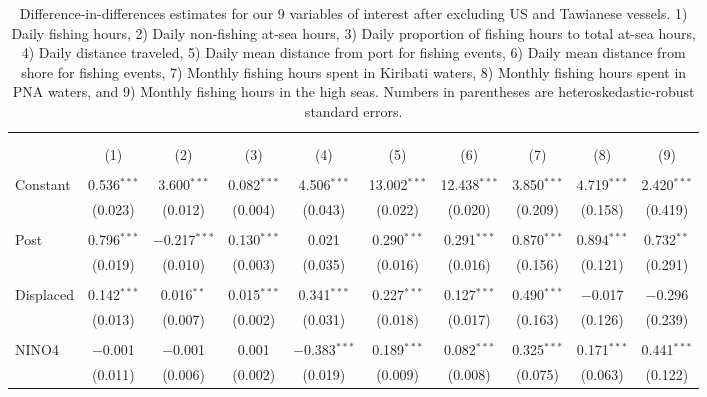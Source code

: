 
\begin{table}[H] \centering 
  \caption{\label{tab:DID_without_USA_TWN}Difference-in-differences estimates for our 9 variables of interest after excluding US and Tawianese vessels. 1) Daily fishing hours, 2) Daily non-fishing at-sea hours, 3) Daily proportion of fishing hours to total at-sea hours, 4) Daily distance traveled, 5) Daily mean distance from port for fishing events, 6) Daily mean distance from shore for fishing events, 7) Monthly fishing hours spent in Kiribati waters, 8) Monthly fishing hours spent in PNA waters, and 9) Monthly fishing hours in the high seas. Numbers in parentheses are heteroskedastic-robust standard errors.} 
  \label{} 
\footnotesize 
\begin{tabular}{@{\extracolsep{1pt}}lccccccccc} 
\\[-1.8ex]\hline 
\hline \\[-1.8ex] 
\\[-1.8ex] & (1) & (2) & (3) & (4) & (5) & (6) & (7) & (8) & (9)\\ 
\hline \\[-1.8ex] 
 Constant & 0.536$^{***}$ & 3.600$^{***}$ & 0.082$^{***}$ & 4.506$^{***}$ & 13.002$^{***}$ & 12.438$^{***}$ & 3.850$^{***}$ & 4.719$^{***}$ & 2.420$^{***}$ \\ 
  & (0.023) & (0.012) & (0.004) & (0.043) & (0.022) & (0.020) & (0.209) & (0.158) & (0.419) \\ 
  & & & & & & & & & \\ 
 Post & 0.796$^{***}$ & $-$0.217$^{***}$ & 0.130$^{***}$ & 0.021 & 0.290$^{***}$ & 0.291$^{***}$ & 0.870$^{***}$ & 0.894$^{***}$ & 0.732$^{**}$ \\ 
  & (0.019) & (0.010) & (0.003) & (0.035) & (0.016) & (0.016) & (0.156) & (0.121) & (0.291) \\ 
  & & & & & & & & & \\ 
 Displaced & 0.142$^{***}$ & 0.016$^{**}$ & 0.015$^{***}$ & 0.341$^{***}$ & 0.227$^{***}$ & 0.127$^{***}$ & 0.490$^{***}$ & $-$0.017 & $-$0.296 \\ 
  & (0.013) & (0.007) & (0.002) & (0.031) & (0.018) & (0.017) & (0.163) & (0.126) & (0.239) \\ 
  & & & & & & & & & \\ 
 NINO4 & $-$0.001 & $-$0.001 & 0.001 & $-$0.383$^{***}$ & 0.189$^{***}$ & 0.082$^{***}$ & 0.325$^{***}$ & 0.171$^{***}$ & 0.441$^{***}$ \\ 
  & (0.011) & (0.006) & (0.002) & (0.019) & (0.009) & (0.008) & (0.075) & (0.063) & (0.122) \\ 

\end{tabular}
\end{table}
